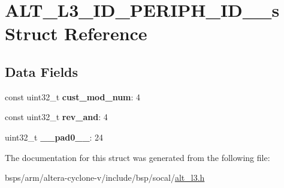 \hypertarget{structALT__L3__ID__PERIPH__ID__3__s}{}\section{A\+L\+T\+\_\+\+L3\+\_\+\+I\+D\+\_\+\+P\+E\+R\+I\+P\+H\+\_\+\+I\+D\+\_\+\_\+s Struct Reference}
\label{structALT__L3__ID__PERIPH__ID__3__s}
\subsection*{Data Fields}
\begin{DoxyCompactItemize}
\item 
\mbox{\label{structALT__L3__ID__PERIPH__ID__3__s_a81e7db9cac77dc3b0c1e2eff01b8db45}} 
const uint32\+\_\+t {\bfseries cust\+\_\+mod\+\_\+num}\+: 4
\item 
\mbox{\label{structALT__L3__ID__PERIPH__ID__3__s_a1dd756e099879d6b429ffbb8629090e1}} 
const uint32\+\_\+t {\bfseries rev\+\_\+and}\+: 4
\item 
\mbox{\label{structALT__L3__ID__PERIPH__ID__3__s_a17f4e75689e5098c887a7d071518eabf}} 
uint32\+\_\+t {\bfseries \+\_\+\+\_\+pad0\+\_\+\+\_\+}\+: 24
\end{DoxyCompactItemize}


The documentation for this struct was generated from the following file\+:\begin{DoxyCompactItemize}
\item 
bsps/arm/altera-\/cyclone-\/v/include/bsp/socal/\mbox{\hyperlink{alt__l3_8h}{alt\+\_\+l3.\+h}}\end{DoxyCompactItemize}
